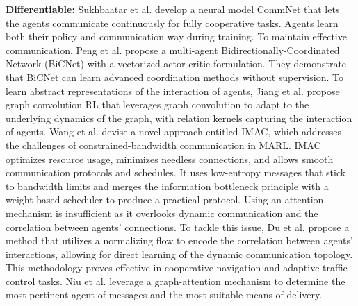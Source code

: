 \documentclass[acmsmall]{acmart}
\begin{document}
\textbf{Differentiable:}
Sukhbaatar et al. \cite{NIPS2016_55b1927f} develop a neural model CommNet that lets the agents communicate continuously for fully cooperative tasks. Agents learn both their policy and communication way during training. 
To maintain effective communication, Peng et al. \cite{peng2017multiagent} propose a multi-agent Bidirectionally-Coordinated Network (BiCNet) with a vectorized actor-critic formulation. They demonstrate that BiCNet can learn advanced coordination methods without supervision.
To learn abstract representations of the interaction of agents, Jiang et al. \cite{Jiang2020Graph} propose graph convolution RL that leverages graph convolution to adapt to the underlying dynamics of the graph, with relation kernels capturing the interaction of agents.  
Wang et al.\cite{pmlr-v119-wang20i} devise a novel approach entitled IMAC, which addresses the challenges of constrained-bandwidth communication in MARL. IMAC optimizes resource usage, minimizes needless connections, and allows smooth communication protocols and schedules. It uses low-entropy messages that stick to bandwidth limits and merges the information bottleneck principle with a weight-based scheduler to produce a practical protocol.
Using an attention mechanism is insufficient as it overlooks dynamic communication and the correlation between agents' connections. To tackle this issue, Du et al. \cite{10.5555/3463952.3464010} propose a method that utilizes a normalizing flow to encode the correlation between agents' interactions, allowing for direct learning of the dynamic communication topology. This methodology proves effective in cooperative navigation and adaptive traffic control tasks.
Niu et al. \cite{10.5555/3463952.3464065} leverage a graph-attention mechanism to determine the most pertinent agent of messages and the most suitable means of delivery. %
\end{document}
